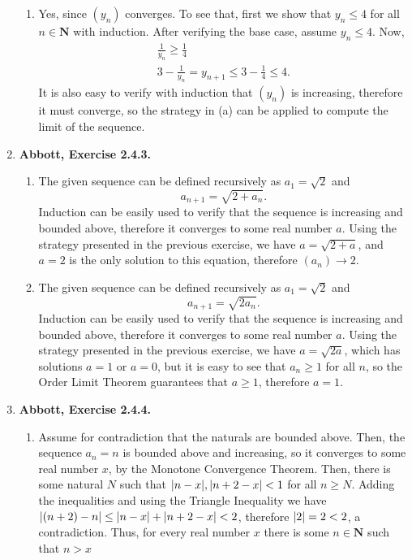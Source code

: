\documentclass{article}
\DeclarePairedDelimiter\abs{\lvert}{\rvert}
\newcommand{\N}{\mathbf{N}}
\newcommand{\exc}[2][Abbott]{\item \textbf{#1, Exercise #2.}}
\begin{document}
\begin{enumerate}
\begin{enumerate}
        \item Yes, since $(y_n)$ converges. To see that, first we show that $y_n \leq 4$ for all $n \in \N$ with induction. After verifying the base case, assume $y_n \leq 4$. Now, \begin{gather*}
            \frac{1}{y_n} \geq \frac{1}{4} \\ 
            3 - \frac{1}{y_n} = y_{n+1} \leq 3-\frac{1}{4} \leq 4.
        \end{gather*} It is also easy to verify with induction that $(y_n)$ is increasing, therefore it must converge, so the strategy in (a) can be applied to compute the limit of the sequence.
    \end{enumerate}
    
    \exc{2.4.3} 
    \begin{enumerate}
        \item The given sequence can be defined recursively as $a_1 = \sqrt{2}$ and
        \begin{equation*}
            a_{n+1} = \sqrt{2 + a_n}.
        \end{equation*} Induction can be easily used to verify that the sequence is increasing and bounded above, therefore it converges to some real number $a$. Using the strategy presented in the previous exercise, we have $a = \sqrt{2 + a}$, and $a=2$ is the only solution to this equation, therefore $(a_n) \to 2$.
        
        \item The given sequence can be defined recursively as $a_1 = \sqrt{2}$ and
        \begin{equation*}
            a_{n+1} = \sqrt{2 a_n}.
        \end{equation*} Induction can be easily used to verify that the sequence is increasing and bounded above, therefore it converges to some real number $a$. Using the strategy presented in the previous exercise, we have $a = \sqrt{2a}$, which has solutions $a = 1$ or $a = 0$, but it is easy to see that $a_n \geq 1$ for all $n$, so the Order Limit Theorem guarantees that $a \geq 1$, therefore $a = 1$.
    \end{enumerate}
    
    \exc{2.4.4}
    \begin{enumerate}
        \item Assume for contradiction that the naturals are bounded above. Then, the sequence $a_n = n$ is bounded above and increasing, so it converges to some real number $x$, by the Monotone Convergence Theorem. Then, there is some natural $N$ such that $\abs*{n-x}, \abs*{n+2-x} < 1$ for all $n \geq N$. Adding the inequalities and using the Triangle Inequality we have $\abs*{(n+2)-n} \leq \abs*{n-x}+\abs*{n+2-x} < 2$, therefore $\abs*{2}=2 < 2$, a contradiction. Thus, for every real number $x$ there is some $n \in \N$ such that $n > x$
        

\end{enumerate}
\end{enumerate}
\end{document}
